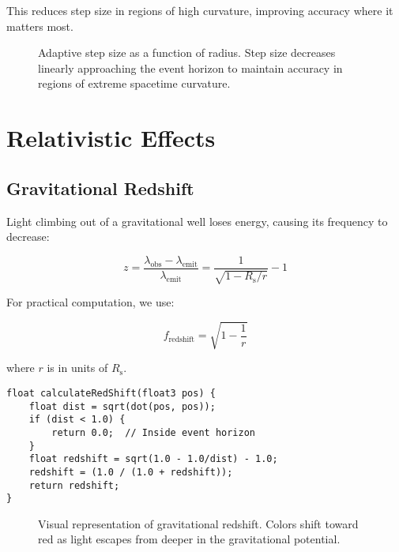 \documentclass[12pt,a4paper]{article}
\theoremstyle{definition}
\theoremstyle{remark}
\newcommand{\Rs}{R_{\text{s}}}
\begin{document}
This reduces step size in regions of high curvature, improving accuracy where it matters most.

\begin{figure}[H]
    \centering
    \caption{Adaptive step size as a function of radius. Step size decreases linearly approaching the event horizon to maintain accuracy in regions of extreme spacetime curvature.}
    \label{fig:adaptive_stepping}
\end{figure}

\section{Relativistic Effects}

\subsection{Gravitational Redshift}

Light climbing out of a gravitational well loses energy, causing its frequency to decrease:

\begin{equation}
    z = \frac{\lambda_{\text{obs}} - \lambda_{\text{emit}}}{\lambda_{\text{emit}}} = \frac{1}{\sqrt{1 - \Rs/r}} - 1
\end{equation}

For practical computation, we use:

\begin{equation}
    f_{\text{redshift}} = \sqrt{1 - \frac{1}{r}}
\end{equation}

where $r$ is in units of $\Rs$.

\begin{lstlisting}[style=metalstyle, caption=Gravitational redshift calculation]
float calculateRedShift(float3 pos) {
    float dist = sqrt(dot(pos, pos));
    if (dist < 1.0) {
        return 0.0;  // Inside event horizon
    }
    float redshift = sqrt(1.0 - 1.0/dist) - 1.0;
    redshift = (1.0 / (1.0 + redshift));
    return redshift;
}
\end{lstlisting}

\begin{figure}[H]
    \centering
    \caption{Visual representation of gravitational redshift. Colors shift toward red as light escapes from deeper in the gravitational potential.}
    \label{fig:redshift_visualization}
\end{figure}
\end{document}

